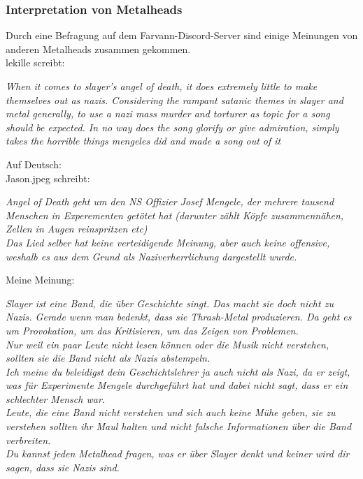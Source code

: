 \documentclass[twocolumn,10pt]{article}
\begin{document}
			\clearpage
			\subsubsection{Interpretation von Metalheads}
			Durch eine Befragung auf dem Farvann-Discord-Server sind einige Meinungen von anderen Metalheads zusammen gekommen.\\
			lekille screibt:
			\begin{center}
			\textit{When it comes to slayer's angel of death, it does extremely little to make themselves out as nazis. Considering the rampant satanic themes in slayer and metal generally, to use a nazi mass murder and torturer as topic for a song should be expected. In no way does the song glorify or give admiration, simply takes the horrible things mengeles did and made a song out of it}	
			\end{center}
			Auf Deutsch: \\
			Jason.jpeg schreibt:
			\begin{center}
				\textit{Angel of Death geht um den NS Offizier Josef Mengele, der mehrere tausend Menschen in Experementen getötet hat (darunter zählt Köpfe zusammennähen, Zellen in Augen reinspritzen etc)}\\
				\textit{Das Lied selber hat keine verteidigende Meinung, aber auch keine offensive, weshalb es aus dem Grund als Naziverherrlichung dargestellt wurde.}
			\end{center}
			Meine Meinung:
			\begin{center}
				\textit{Slayer ist eine Band, die über Geschichte singt. Das macht sie doch nicht zu Nazis. Gerade wenn man bedenkt, dass sie Thrash-Metal produzieren. Da geht es um Provokation, um das Kritisieren, um das Zeigen von Problemen.}\\
				\textit{Nur weil ein paar Leute nicht lesen können oder die Musik nicht verstehen, sollten sie die Band nicht als Nazis abstempeln.}\\
				\textit{Ich meine du beleidigst dein Geschichtslehrer ja auch nicht als Nazi, da er zeigt, was für Experimente Mengele durchgeführt hat und dabei nicht sagt, dass er ein schlechter Mensch war.}\\
				\textit{Leute, die eine Band nicht verstehen und sich auch keine Mühe geben, sie zu verstehen sollten ihr Maul halten und nicht falsche Informationen über die Band verbreiten.}\\
				\textit{Du kannst jeden Metalhead fragen, was er über Slayer denkt und keiner wird dir sagen, dass sie Nazis sind.}
			\end{center}
\end{document}
